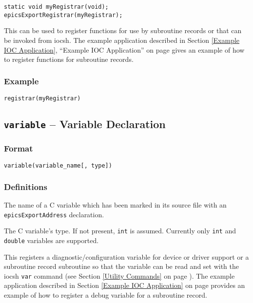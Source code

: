 \begin{verbatim}
static void myRegistrar(void);
epicsExportRegistrar(myRegistrar);
\end{verbatim}

This can be used to register functions for use by subroutine records or that can be invoked from iocsh. The example 
application described in Section \ref{Example IOC Application}, ``Example IOC Application'' on page \pageref{Example IOC Application}
gives an example of how to register functions for subroutine records.

\subsubsection{Example}

\begin{verbatim}
registrar(myRegistrar)
\end{verbatim}

\subsection{\texttt{variable} -- Variable Declaration}

\subsubsection{Format}

\begin{verbatim}
variable(variable_name[, type])
\end{verbatim}

\subsubsection{Definitions}

\begin{description}
\item [variable\_name] The name of a C variable which has been marked in its source file with an 
\verb|epicsExportAddress| declaration.

\item [type] The C variable's type.
If not present, \verb|int| is assumed.
Currently only \verb|int| and \verb|double| variables are supported.
\end{description}

This registers a diagnostic/configuration variable for device or driver support or a subroutine record subroutine so that
the variable can be read and set with the iocsh \verb|var| command (see Section \ref{Utility Commands} on page \pageref{Utility Commands}).
The example application described in Section \ref{Example IOC Application} on page \pageref{Example IOC Application}
provides an example of how to register a debug variable for a subroutine record.

